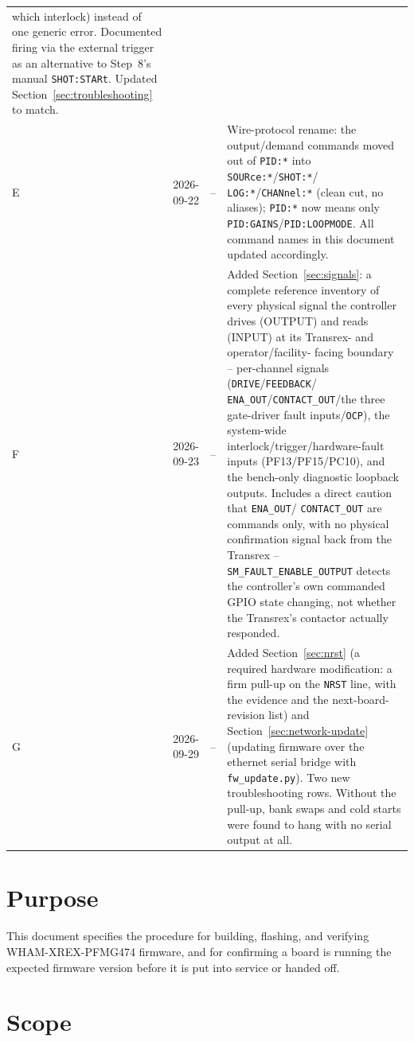\documentclass[11pt]{article}
\newcommand{\code}[1]{\texttt{#1}}
\begin{document}
\begin{longtable}{p{0.45in} p{0.75in} p{0.5in} p{2.7in}}
    which interlock) instead of one generic error. Documented firing
    via the external trigger as an alternative to Step~8's manual
    \code{SHOT:STARt}. Updated
    Section~\ref{sec:troubleshooting} to match. \\
  E & 2026-09-22 & -- & Wire-protocol rename: the output/demand commands
    moved out of \code{PID:*} into \code{SOURce:*}/\code{SHOT:*}/
    \code{LOG:*}/\code{CHANnel:*} (clean cut, no aliases);
    \code{PID:*} now means only \code{PID:GAINS}/\code{PID:LOOPMODE}.
    All command names in this document updated accordingly. \\
  F & 2026-09-23 & -- & Added Section~\ref{sec:signals}: a complete
    reference inventory of every physical signal the controller drives
    (OUTPUT) and reads (INPUT) at its Transrex- and operator/facility-
    facing boundary -- per-channel signals (\code{DRIVE}/\code{FEEDBACK}/
    \code{ENA\_OUT}/\code{CONTACT\_OUT}/the three gate-driver fault
    inputs/\code{OCP}), the system-wide interlock/trigger/hardware-fault
    inputs (PF13/PF15/PC10), and the bench-only diagnostic loopback
    outputs. Includes a direct caution that \code{ENA\_OUT}/
    \code{CONTACT\_OUT} are commands only, with no physical confirmation
    signal back from the Transrex -- \code{SM\_FAULT\_ENABLE\_OUTPUT}
    detects the controller's own commanded GPIO state changing, not
    whether the Transrex's contactor actually responded. \\
  G & 2026-09-29 & -- & Added Section~\ref{sec:nrst} (a required
    hardware modification: a firm pull-up on the \code{NRST} line, with
    the evidence and the next-board-revision list) and
    Section~\ref{sec:network-update} (updating firmware over the
    ethernet serial bridge with \code{fw\_update.py}). Two new
    troubleshooting rows. Without the pull-up, bank swaps and cold
    starts were found to hang with no serial output at all. \\
  \hline
\end{longtable}

\section{Purpose}

This document specifies the procedure for building, flashing, and
verifying WHAM-XREX-PFMG474 firmware, and for confirming a board is
running the expected firmware version before it is put into service or
handed off.

\section{Scope}
\label{sec:scope}
\end{document}
